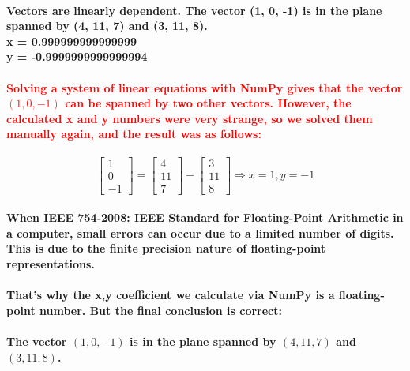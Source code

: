 \documentclass[11pt]{article} %
\begin{document}
\paragraph{Vectors are linearly dependent.
The vector (1, 0, -1) is in the plane spanned by (4, 11, 7) and (3, 11, 8). \\
x = 0.999999999999999 \\
y = -0.9999999999999994}
\paragraph{\textcolor{red}{Solving a system of linear equations with NumPy gives that the vector $(1,0,-1)$ can be spanned by two other vectors. However, the calculated x and y numbers were very strange, so we solved them manually again, and the result was as follows:}}
$$ \begin{bmatrix} 1 \\ 0 \\ -1 \end{bmatrix} = \begin{bmatrix} 4 \\11 \\ 7 \end{bmatrix} - \begin{bmatrix} 3 \\ 11 \\ 8 \end{bmatrix} \Rightarrow x = 1, y=-1 $$
\paragraph{When IEEE 754-2008: IEEE Standard for Floating-Point Arithmetic in a computer, small errors can occur due to a limited number of digits. This is due to the finite precision nature of floating-point representations.}
\paragraph{That's why the x,y coefficient we calculate via NumPy is a floating-point number. But the final conclusion is correct: }
\paragraph{\textbf{The vector $(1,0,-1)$ is in the plane spanned by $(4,11,7)$ and $(3,11,8)$.}}
% 
% 

\end{document}
